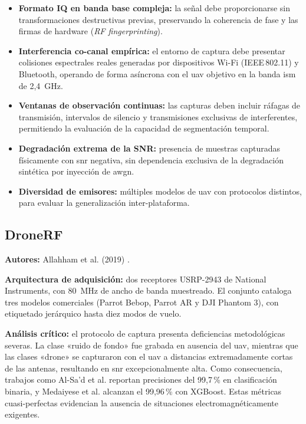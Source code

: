 \begin{itemize}
 \item \textbf{Formato IQ en banda base compleja:} la señal debe proporcionarse
 sin transformaciones destructivas previas, preservando la coherencia de fase y
 las firmas de hardware (\textit{RF fingerprinting}).

 \item \textbf{Interferencia co-canal empírica:} el entorno de captura debe
 presentar colisiones espectrales reales generadas por dispositivos Wi-Fi
 (IEEE\,802.11) y Bluetooth, operando de forma asíncrona con el \gls{uav} objetivo
 en la banda \gls{ism} de 2,4\, GHz.

 \item \textbf{Ventanas de observación continuas:} las capturas deben incluir
 ráfagas de transmisión, intervalos de silencio y transmisiones exclusivas de
 interferentes, permitiendo la evaluación de la capacidad de segmentación temporal.

 \item \textbf{Degradación extrema de la SNR:} presencia de muestras capturadas
 físicamente con \gls{snr} negativa, sin dependencia exclusiva de la degradación
 sintética por inyección de \gls{awgn}.

 \item \textbf{Diversidad de emisores:} múltiples modelos de \gls{uav} con protocolos
 distintos, para evaluar la generalización inter-plataforma.
\end{itemize}

\subsection{DroneRF}
\label{subsec:dronerf}

\textbf{Autores:} Allahham et al. (2019) \cite{allahham_dronerf_2019}.

\textbf{Arquitectura de adquisición:} dos receptores USRP-2943 de National Instruments,
con 80\, MHz de ancho de banda muestreado. El conjunto cataloga tres modelos
comerciales (Parrot Bebop, Parrot AR y DJI Phantom 3), con etiquetado jerárquico
hasta diez modos de vuelo.

\textbf{Análisis crítico:} el protocolo de captura presenta deficiencias metodológicas
severas. La clase «ruido de fondo» fue grabada en ausencia del \gls{uav}, mientras que
las clases «drone» se capturaron con el \gls{uav} a distancias extremadamente cortas
de las antenas, resultando en \gls{snr} excepcionalmente alta. Como consecuencia,
trabajos como Al-Sa'd et al. \cite{al-sad_rf-based_2019} reportan precisiones del
99,7\,\% en clasificación binaria, y Medaiyese et al. \cite{medaiyese_machine_2021}
alcanzan el 99,96\,\% con XGBoost. Estas métricas cuasi-perfectas evidencian la
ausencia de situaciones electromagnéticamente exigentes.

